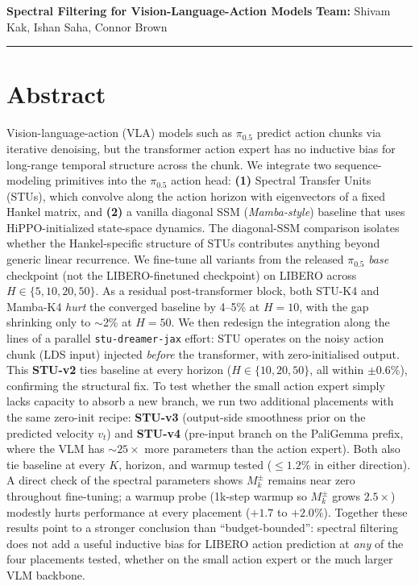 \documentclass[10pt, letterpaper]{article}
\begin{document}
{\large \textbf{Spectral Filtering for Vision-Language-Action Models}} \hfill \textbf{Team:} Shivam Kak, Ishan Saha, Connor Brown \\
\rule{\textwidth}{0.4pt}

\section*{Abstract}

Vision-language-action (VLA) models such as $\pi_{0.5}$ predict action chunks via iterative denoising, but the transformer action expert has no inductive bias for long-range temporal structure across the chunk. We integrate two sequence-modeling primitives into the $\pi_{0.5}$ action head: \textbf{(1)} Spectral Transfer Units (STUs), which convolve along the action horizon with eigenvectors of a fixed Hankel matrix, and \textbf{(2)} a vanilla diagonal SSM (\emph{Mamba-style}) baseline that uses HiPPO-initialized state-space dynamics. The diagonal-SSM comparison isolates whether the Hankel-specific structure of STUs contributes anything beyond generic linear recurrence. We fine-tune all variants from the released $\pi_{0.5}$ \emph{base} checkpoint (not the LIBERO-finetuned checkpoint) on LIBERO across $H \in \{5, 10, 20, 50\}$. As a residual post-transformer block, both STU-K4 and Mamba-K4 \emph{hurt} the converged baseline by 4--5\% at $H{=}10$, with the gap shrinking only to $\sim$2\% at $H{=}50$. We then redesign the integration along the lines of a parallel \texttt{stu-dreamer-jax} effort: STU operates on the noisy action chunk (LDS input) injected \emph{before} the transformer, with zero-initialised output. This \textbf{STU-v2} ties baseline at every horizon ($H \in \{10, 20, 50\}$, all within $\pm$0.6\%), confirming the structural fix. To test whether the small action expert simply lacks capacity to absorb a new branch, we run two additional placements with the same zero-init recipe: \textbf{STU-v3} (output-side smoothness prior on the predicted velocity $v_t$) and \textbf{STU-v4} (pre-input branch on the PaliGemma prefix, where the VLM has $\sim 25\times$ more parameters than the action expert). Both also tie baseline at every $K$, horizon, and warmup tested ($\le 1.2\%$ in either direction). A direct check of the spectral parameters shows $M_k^\pm$ remains near zero throughout fine-tuning; a warmup probe (1k-step warmup so $M_k^\pm$ grows $2.5\times$) modestly hurts performance at every placement ($+1.7$ to $+2.0\%$). Together these results point to a stronger conclusion than ``budget-bounded'': spectral filtering does not add a useful inductive bias for LIBERO action prediction at \emph{any} of the four placements tested, whether on the small action expert or the much larger VLM backbone.
\end{document}
